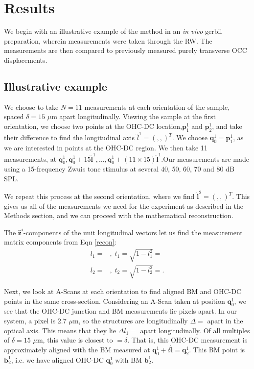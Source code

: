 \documentclass[preprint,NumberedRefs]{JASA}
\begin{document}
\par{\section{Results}
We begin with an illustrative example of the method in an \textit{in vivo} gerbil preparation, wherein measurements were taken through the RW. The measurements are then compared to previously measured purely transverse OCC displacements.}
\subsection{Illustrative example}
\par{We choose to take $N=11$ measurements at each orientation of the sample, spaced $\delta=15$ $\mu$m apart longitudinally. Viewing the sample at the first orientation, we choose two points at the OHC-DC location,$\mathbf{p}^1_1$ and $\mathbf{p}^1_2$, and take their difference to find the longitudinal axis $\hat{l}^1=(,,)^T$. We choose $\mathbf{q}^1_0=\mathbf{p}^1_1$, as we are interested in points at the OHC-DC region. We then take 11 measurements, at $\mathbf{q}^1_0,\mathbf{q}^1_0+15\mathbf{\hat{l}}^1,\ldots,\mathbf{q}^1_0+(11\times15)\mathbf{\hat{l}}^1$.Our measurements are made using a 15-frequency Zwuis tone stimulus at several 40, 50, 60, 70 and 80 dB SPL.}
\par{We repeat this process at the second orientation, where we find $\mathbf{\hat{l}}^2=(,,)^T$. This gives us all of the measurements we need for the experiment as described in the Methods section, and we can proceed with the mathematical reconstruction.}
\par{The $\mathbf{\hat{z}}^i$-components of the unit longitudinal vectors let us find the measurement matrix components from Eqn \ref{recon}:
	\begin{align}
		l_1 = &,\;t_1 = \sqrt{1-l_1^2}= \\
		l_2 = &,\;t_2 = \sqrt{1-l_2^2}=.
	\end{align}
}
\par{Next, we look at A-Scans at each orientation to find aligned BM and OHC-DC points in the same cross-section. Considering an A-Scan taken at position $\mathbf{q}^1_0$, we see that the OHC-DC junction and BM measurements lie  pixels apart. In our system, a pixel is 2.7 $\mu$m, so the structures are longitudinally $\Delta = $ apart in the optical axis. This means that they lie $\Delta l_1 = $ apart longitudinally. Of all multiples of $\delta = 15$ $\mu$m, this value is closest to $ = \delta$. That is, this OHC-DC measurement is approximately aligned with the BM measured at $\mathbf{q}^1_0+\delta\mathbf{\hat{l}}=\mathbf{q}^1_2$. This BM point is $\mathbf{b}^1_2$, i.e. we have aligned OHC-DC $\mathbf{q}^1_0$ with BM $\mathbf{b}^1_2$.}
\end{document}
